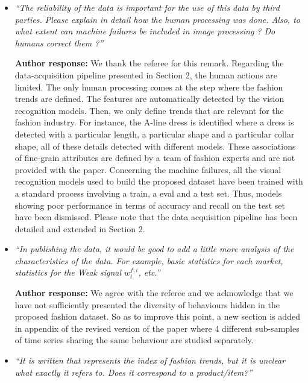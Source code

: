 \documentclass[10pt]{article} %
\begin{document}
\begin{itemize}
	\item {\em ``The reliability of the data is important for the use of this data by third parties. Please explain in detail how the human processing was done. Also, to what extent can machine failures be included in image processing ? Do humans correct them ?''} \medskip
	
	\textbf{Author response:} We thank the referee for this remark. Regarding the data-acquisition pipeline presented in Section 2, the human actions are limited. The only human processing comes at the step where the fashion trends are defined. The features are automatically detected by the vision recognition models. Then, we only define trends that are relevant for the fashion industry. For instance, the A-line dress is identified where a dress is detected with a particular length, a particular shape and a particular collar shape, all of these details detected with different models. These associations of fine-grain attributes are defined by a team of fashion experts and are not provided with the paper. 
Concerning the machine failures, all the visual recognition models used to build the proposed dataset have been trained with a standard process involving a train, a eval and a test set. Thus, models showing poor performance in terms of accuracy and recall on the test set have been dismissed. Please note that the data acquisition pipeline has been detailed and extended in Section 2. \\
	
	\item {\em ``In publishing the data, it would be good to add a little more analysis of the characteristics of the data. For example, basic statistics for each market, statistics for the Weak signal $w^{f,i}_t$, etc.''} \medskip
	
	\textbf{Author response:} We agree with the referee and we acknowledge that we have not sufficiently presented the diversity of behaviours hidden in the proposed fashion dataset. So as to improve this point, a new section is added in appendix of the revised version of the paper where 4 different sub-samples of time series sharing the same behaviour are studied separately. \\
	
	\item {\em ``It is written that represents the index of fashion trends, but it is unclear what exactly it refers to. Does it correspond to a product/item?''} \medskip


\end{itemize}
\end{document}
